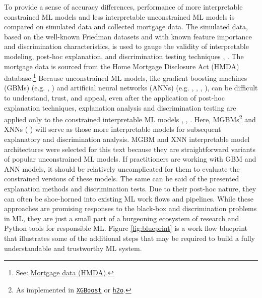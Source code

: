 \documentclass[information,article,submit,moreauthors,pdftex]{definitions/mdpi}
\begin{document}
To provide a sense of accuracy differences, performance of more interpretable constrained ML models and less interpretable unconstrained ML models is compared on simulated data and collected mortgage data. The simulated data, based on the well-known Friedman datasets and with known feature importance and discrimination characteristics, is used to gauge the validity of interpretable modeling, post-hoc explanation, and discrimination testing techniques \cite{friedman1979tree}, \cite{friedman1991multivariate}. The mortgage data is sourced from the Home Mortgage Disclosure Act (HMDA) database.\footnote{See: \href{https://www.consumerfinance.gov/data-research/hmda/}{Mortgage data (HMDA)}.} Because unconstrained ML models, like gradient boosting machines (GBMs) (e.g. \cite{friedman2001greedy}, \cite{esl}) and artificial neural networks (ANNs) (e.g. \cite{recht2011hogwild}, \cite{hinton2012improving}, \cite{sutskever2013importance}, \cite{zeiler2012adadelta}), can be difficult to understand, trust, and appeal, even after the application of post-hoc explanation techniques, explanation analysis and discrimination testing are applied only to the constrained interpretable ML models \cite{please_stop}, \cite{fair_washing}, \cite{scaffolding}. Here, MGBMs\footnote{As implemented in \href{https://xgboost.readthedocs.io/en/latest/tutorials/monotonic.html}{\texttt{XGBoost}} or \href{https://github.com/h2oai/h2o-3/blob/master/h2o-py/demos/H2O_tutorial_gbm_monotonicity.ipynb}{\texttt{h2o}}.} and XNNs (\cite{wf_xnn} \cite{yang2019enhancing}) will serve as those more interpretable models for subsequent explanatory and discrimination analysis. MGBM and XNN interpretable model architectures were selected for this text because they are straightforward variants of popular unconstrained ML models. If practitioners are working with GBM and ANN models, it should be relatively uncomplicated for them to evaluate the constrained versions of these models. The same can be said of the presented explanation methods and discrimination tests. Due to their post-hoc nature, they can often be shoe-horned into existing ML work flows and pipelines. While these approaches are promising responses to the black-box and discrimination problems in ML, they are just a small part of a burgeoning ecosystem of research and Python tools for responsible ML. Figure \ref{fig:blueprint} is a work flow blueprint that illustrates some of the additional steps that may be required to build a fully understandable and trustworthy ML system.
\end{document}
